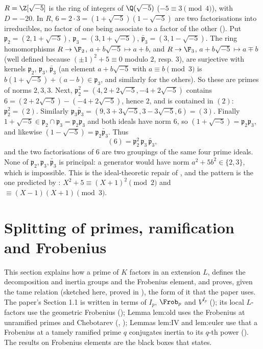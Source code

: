 \begin{example}\label{ex:ant:sqrtminus5}
$R=\Z[\sqrt{-5}]$ is the ring of integers of $\Q(\sqrt{-5})$ ($-5\equiv3\pmod4$), with $D=-20$. In $R$, $6=2\cdot3=(1+\sqrt{-5})(1-\sqrt{-5})$
are two factorisations into irreducibles, no factor of one being associate to a factor of the other (). Put
$\mathfrak p_2=(2,1+\sqrt{-5})$, $\mathfrak p_3=(3,1+\sqrt{-5})$, $\bar{\mathfrak p}_3=(3,1-\sqrt{-5})$. The ring homomorphisms $R\to\F_2$,
$a+b\sqrt{-5}\mapsto a+b$, and $R\to\F_3$, $a+b\sqrt{-5}\mapsto a\mp b$ (well defined because $(\pm1)^2+5\equiv0$ modulo $2$, resp. $3$), are surjective
with kernels $\mathfrak p_2$, $\mathfrak p_3$, $\bar{\mathfrak p}_3$ (an element $a+b\sqrt{-5}$ with $a\equiv b\pmod 3$ is $b(1+\sqrt{-5})+(a-b)\in\mathfrak p_3$,
and similarly for the others). So these are primes of norms $2,3,3$. Next, $\mathfrak p_2^2=(4,2+2\sqrt{-5},-4+2\sqrt{-5})$ contains
$6=(2+2\sqrt{-5})-(-4+2\sqrt{-5})$, hence $2$, and is contained in $(2)$: $\mathfrak p_2^2=(2)$. Similarly $\mathfrak p_3\bar{\mathfrak p}_3=(9,3+3\sqrt{-5},
3-3\sqrt{-5},6)=(3)$. Finally $1+\sqrt{-5}\in\mathfrak p_2\cap\mathfrak p_3=\mathfrak p_2\mathfrak p_3$ and both ideals have norm $6$, so
$(1+\sqrt{-5})=\mathfrak p_2\mathfrak p_3$, and likewise $(1-\sqrt{-5})=\mathfrak p_2\bar{\mathfrak p}_3$. Thus
\[
(6)=\mathfrak p_2^2\,\mathfrak p_3\,\bar{\mathfrak p}_3,
\]
and the two factorisations of $6$ are two groupings of the same four prime ideals. None of $\mathfrak p_2,\mathfrak p_3,\bar{\mathfrak p}_3$ is principal: a
generator would have norm $a^2+5b^2\in\{2,3\}$, which is impossible. This is the ideal-theoretic repair of , and the pattern is
the one predicted by : $X^2+5\equiv(X+1)^2\pmod2$ and $\equiv(X-1)(X+1)\pmod3$.
\end{example}

\section{Splitting of primes, ramification and Frobenius}\label{sec:ant:splitting}

This section explains how a prime of $K$ factors in an extension $L$, defines the decomposition and inertia groups and the Frobenius element,
and proves, given the tame relation (sketched here, proved in ), the form of it that the paper uses. The paper's Section 1.1 is written in terms of $I_p$, $\Frob_p$ and
$V^{I_p}$ (); its local $L$-factors use the geometric Frobenius (); Lemma lem:old uses the
Frobenius at unramified primes and Chebotarev (, ); Lemmas lem:IV and lem:euler use that
a Frobenius at a tamely ramified prime $q$ conjugates inertia to its $q$-th power (). The results on Frobenius elements
are the black boxes that  states.

